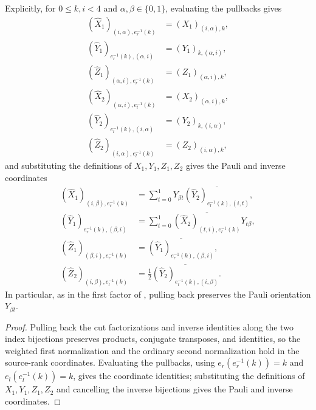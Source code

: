 \begin{definition}
    Explicitly, for $0\leq k,i<4$ and $\alpha,\beta\in\{0,1\}$, evaluating
    the pullbacks gives
    \begin{align}
        (\widehat X_1)_{(i,\alpha),e_r^{-1}(k)} & =(X_1)_{(i,\alpha),k}, \\
        (\widehat Y_1)_{e_r^{-1}(k),(\alpha,i)} & =(Y_1)_{k,(\alpha,i)}, \\
        (\widehat Z_1)_{(\alpha,i),e_r^{-1}(k)} & =(Z_1)_{(\alpha,i),k}, \\
        (\widehat X_2)_{(\alpha,i),e_l^{-1}(k)} & =(X_2)_{(\alpha,i),k}, \\
        (\widehat Y_2)_{e_l^{-1}(k),(i,\alpha)} & =(Y_2)_{k,(i,\alpha)}, \\
        (\widehat Z_2)_{(i,\alpha),e_l^{-1}(k)} & =(Z_2)_{(i,\alpha),k},
    \end{align}
    and substituting the definitions of $X_1,Y_1,Z_1,Z_2$ gives the
    Pauli and inverse coordinates
    \begin{align}
        (\widehat X_1)_{(i,\beta),e_r^{-1}(k)}
         & =\sum_{t=0}^1Y_{\beta t}
        \overline{(\widehat Y_2)_{e_l^{-1}(k),(i,t)}},                           \\
        (\widehat Y_1)_{e_r^{-1}(k),(\beta,i)}
         & =\sum_{t=0}^1\overline{(\widehat X_2)_{(t,i),e_l^{-1}(k)}}Y_{t\beta}, \\
        (\widehat Z_1)_{(\beta,i),e_r^{-1}(k)}
         & =\overline{(\widehat Y_1)_{e_r^{-1}(k),(\beta,i)}},                   \\
        (\widehat Z_2)_{(i,\beta),e_l^{-1}(k)}
         & =\tfrac12\overline{(\widehat Y_2)_{e_l^{-1}(k),(i,\beta)}}.
    \end{align}
    In particular, as in the first factor of
    \cite[lines~4611--4659]{FrancoRubio2025MPUGauging}, pulling back
    preserves the Pauli orientation $Y_{\beta t}$.
\end{definition}

\begin{proof}\leanok
    Pulling back the cut factorizations and inverse identities along the
    two index bijections preserves products, conjugate transposes, and
    identities, so the weighted first normalization and the ordinary
    second normalization hold in the source-rank coordinates.
    Evaluating the pullbacks, using $e_r(e_r^{-1}(k))=k$ and
    $e_l(e_l^{-1}(k))=k$, gives the coordinate identities; substituting
    the definitions of $X_1,Y_1,Z_1,Z_2$ and cancelling the inverse
    bijections gives the Pauli and inverse coordinates.
\end{proof}

